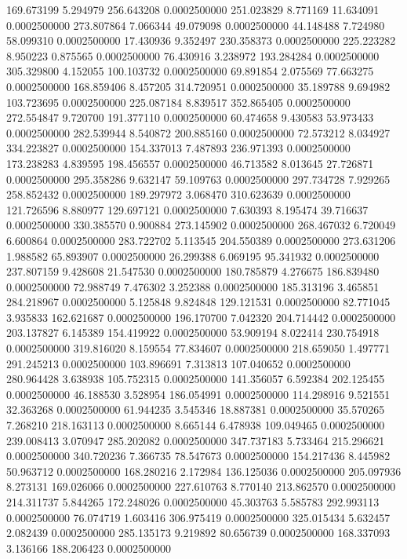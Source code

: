 169.673199 5.294979 256.643208 0.0002500000
251.023829 8.771169 11.634091 0.0002500000
273.807864 7.066344 49.079098 0.0002500000
44.148488 7.724980 58.099310 0.0002500000
17.430936 9.352497 230.358373 0.0002500000
225.223282 8.950223 0.875565 0.0002500000
76.430916 3.238972 193.284284 0.0002500000
305.329800 4.152055 100.103732 0.0002500000
69.891854 2.075569 77.663275 0.0002500000
168.859406 8.457205 314.720951 0.0002500000
35.189788 9.694982 103.723695 0.0002500000
225.087184 8.839517 352.865405 0.0002500000
272.554847 9.720700 191.377110 0.0002500000
60.474658 9.430583 53.973433 0.0002500000
282.539944 8.540872 200.885160 0.0002500000
72.573212 8.034927 334.223827 0.0002500000
154.337013 7.487893 236.971393 0.0002500000
173.238283 4.839595 198.456557 0.0002500000
46.713582 8.013645 27.726871 0.0002500000
295.358286 9.632147 59.109763 0.0002500000
297.734728 7.929265 258.852432 0.0002500000
189.297972 3.068470 310.623639 0.0002500000
121.726596 8.880977 129.697121 0.0002500000
7.630393 8.195474 39.716637 0.0002500000
330.385570 0.900884 273.145902 0.0002500000
268.467032 6.720049 6.600864 0.0002500000
283.722702 5.113545 204.550389 0.0002500000
273.631206 1.988582 65.893907 0.0002500000
26.299388 6.069195 95.341932 0.0002500000
237.807159 9.428608 21.547530 0.0002500000
180.785879 4.276675 186.839480 0.0002500000
72.988749 7.476302 3.252388 0.0002500000
185.313196 3.465851 284.218967 0.0002500000
5.125848 9.824848 129.121531 0.0002500000
82.771045 3.935833 162.621687 0.0002500000
196.170700 7.042320 204.714442 0.0002500000
203.137827 6.145389 154.419922 0.0002500000
53.909194 8.022414 230.754918 0.0002500000
319.816020 8.159554 77.834607 0.0002500000
218.659050 1.497771 291.245213 0.0002500000
103.896691 7.313813 107.040652 0.0002500000
280.964428 3.638938 105.752315 0.0002500000
141.356057 6.592384 202.125455 0.0002500000
46.188530 3.528954 186.054991 0.0002500000
114.298916 9.521551 32.363268 0.0002500000
61.944235 3.545346 18.887381 0.0002500000
35.570265 7.268210 218.163113 0.0002500000
8.665144 6.478938 109.049465 0.0002500000
239.008413 3.070947 285.202082 0.0002500000
347.737183 5.733464 215.296621 0.0002500000
340.720236 7.366735 78.547673 0.0002500000
154.217436 8.445982 50.963712 0.0002500000
168.280216 2.172984 136.125036 0.0002500000
205.097936 8.273131 169.026066 0.0002500000
227.610763 8.770140 213.862570 0.0002500000
214.311737 5.844265 172.248026 0.0002500000
45.303763 5.585783 292.993113 0.0002500000
76.074719 1.603416 306.975419 0.0002500000
325.015434 5.632457 2.082439 0.0002500000
285.135173 9.219892 80.656739 0.0002500000
168.337093 3.136166 188.206423 0.0002500000
